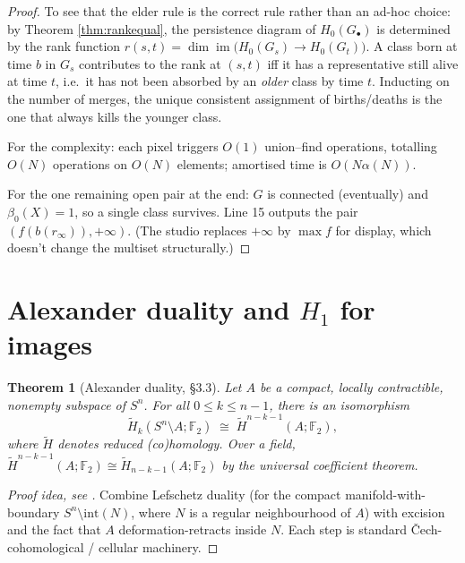 \documentclass[11pt]{article}
\theoremstyle{persdef}
\newtheorem{theorem}[definition]{Theorem}
\newcommand{\F}{\mathbb{F}}
\newcommand{\Ftwo}{\F_2}
\newcommand{\X}{X}
\DeclareMathOperator{\imop}{im}
\newcommand{\Hk}[1]{H_{#1}}
\begin{document}
\begin{proof}
To see that the elder rule is the correct rule rather than an ad-hoc choice: by Theorem \ref{thm:rankequal}, the persistence diagram of $\Hk{0}(G_\bullet)$ is determined by the rank function $r(s,t) = \dim\imop\bigl(\Hk{0}(G_s)\to\Hk{0}(G_t)\bigr)$. A class born at time $b$ in $G_s$ contributes to the rank at $(s,t)$ iff it has a representative still alive at time $t$, i.e.\ it has not been absorbed by an \emph{older} class by time $t$. Inducting on the number of merges, the unique consistent assignment of births/deaths is the one that always kills the younger class.

For the complexity: each pixel triggers $O(1)$ union--find operations, totalling $O(N)$ operations on $O(N)$ elements; amortised time is $O(N\alpha(N))$.

For the one remaining open pair at the end: $G$ is connected (eventually) and $\beta_0(\X)=1$, so a single class survives. Line 15 outputs the pair $(f(b(r_\infty)), +\infty)$. (The studio replaces $+\infty$ by $\max f$ for display, which doesn't change the multiset structurally.)
\end{proof}

\section{Alexander duality and \texorpdfstring{$H_1$}{H1} for images}

\begin{theorem}[Alexander duality, \cite{Hat02} \S 3.3]\label{thm:AD}
Let $A$ be a compact, locally contractible, nonempty subspace of $S^n$. For all $0\leq k\leq n-1$, there is an isomorphism
\[
\widetilde{H}_k(S^n\setminus A;\Ftwo) \;\cong\; \widetilde{H}^{n-k-1}(A;\Ftwo),
\]
where $\widetilde{H}$ denotes reduced (co)homology. Over a field, $\widetilde{H}^{n-k-1}(A;\Ftwo)\cong\widetilde{H}_{n-k-1}(A;\Ftwo)$ by the universal coefficient theorem.
\end{theorem}

\begin{proof}[Proof idea, see {\cite[Thm.~3.44]{Hat02}}]
Combine Lefschetz duality (for the compact manifold-with-boundary $S^n\setminus\mathrm{int}(N)$, where $N$ is a regular neighbourhood of $A$) with excision and the fact that $A$ deformation-retracts inside $N$. Each step is standard \v Cech-cohomological / cellular machinery.
\end{proof}
\end{document}
